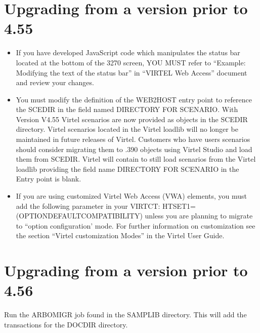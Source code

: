 \documentclass[letterpaper,10pt,english]{sphinxmanual}
\begin{document}
\ignorespaces 

\section{Upgrading from a version prior to 4.55}
\label{\detokenize{Migration_Guide:upgrading-from-a-version-prior-to-4-55}}\label{\detokenize{Migration_Guide:index-5}}\begin{itemize}
\item {} 
\sphinxAtStartPar
If you have developed JavaScript code which manipulates the status bar located at the bottom of the 3270 screen, YOU MUST refer to “Example: Modifying the text of the status bar” in “VIRTEL Web Access” document and review your changes.

\item {} 
\sphinxAtStartPar
You must modify the definition of the WEB2HOST entry point to reference the SCE\sphinxhyphen{}DIR in the field named DIRECTORY FOR SCENARIO. With Version V4.55 Virtel scenarios are now provided as objects in the SCE\sphinxhyphen{}DIR directory. Virtel scenarios located in the Virtel loadlib will no longer be maintained in future releases of Virtel. Customers who have users scenarios should consider migrating them to .390 objects using Virtel Studio and load them from SCE\sphinxhyphen{}DIR. Virtel will contain to still load scenarios from the Virtel loadlib providing the field name DIRECTORY FOR SCENARIO in the Entry point is blank.

\item {} 
\sphinxAtStartPar
If you are using customized Virtel Web Access (VWA) elements, you must add the following parameter in your VIRTCT: HTSET1=(OPTION\sphinxhyphen{}DEFAULT\sphinxhyphen{}COMPATIBILITY) unless you are planning to migrate to “option configuration’ mode. For further information on customization see the section “Virtel customization Modes” in the Virtel User Guide.

\end{itemize}

\ignorespaces 

\section{Upgrading from a version prior to 4.56}
\label{\detokenize{Migration_Guide:upgrading-from-a-version-prior-to-4-56}}\label{\detokenize{Migration_Guide:index-6}}
\sphinxAtStartPar
Run the ARBOMIGR job found in the SAMPLIB directory. This will add the transactions for the DOC\sphinxhyphen{}DIR directory.
\end{document}
